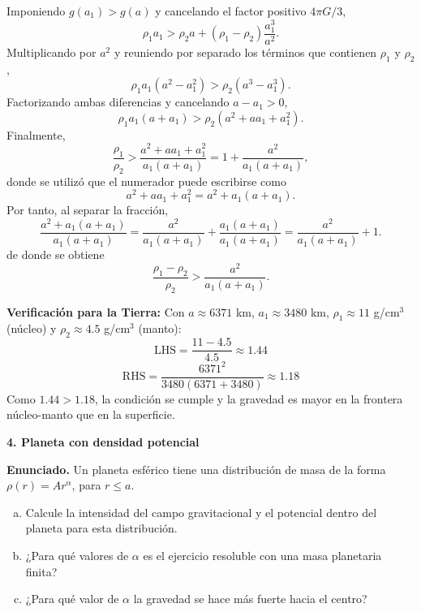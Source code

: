 \begin{enumerate}[a)]
    Imponiendo $g(a_1)>g(a)$ y cancelando el factor positivo $4\pi G/3$,
    $$
    \rho_1a_1>
    \rho_2a+(\rho_1-\rho_2)\frac{a_1^3}{a^2}.
    $$
    Multiplicando por $a^2$ y reuniendo por separado los términos que contienen
    $\rho_1$ y $\rho_2$,
    $$
    \rho_1a_1(a^2-a_1^2)>
    \rho_2(a^3-a_1^3).
    $$
    Factorizando ambas diferencias y cancelando $a-a_1>0$,
    $$
    \rho_1a_1(a+a_1)>
    \rho_2(a^2+aa_1+a_1^2).
    $$
    Finalmente,
    $$
    \frac{\rho_1}{\rho_2}>
    \frac{a^2+aa_1+a_1^2}{a_1(a+a_1)}
    =1+\frac{a^2}{a_1(a+a_1)},
    $$
    donde se utilizó que el numerador puede escribirse como
    $$
    a^2+aa_1+a_1^2
    =a^2+a_1(a+a_1).
    $$
    Por tanto, al separar la fracción,
    $$
    \frac{a^2+a_1(a+a_1)}{a_1(a+a_1)}
    =\frac{a^2}{a_1(a+a_1)}
    +\frac{a_1(a+a_1)}{a_1(a+a_1)}
    =\frac{a^2}{a_1(a+a_1)}+1.
    $$
    de donde se obtiene
    $$
    \boxed{
    \frac{\rho_1-\rho_2}{\rho_2}>
    \frac{a^2}{a_1(a+a_1)}
    }.
    $$
    
    \textbf{Verificación para la Tierra:} Con $a \approx 6371$ km, $a_1 \approx 3480$ km, $\rho_1 \approx 11$ g/cm$^3$ (núcleo) y $\rho_2 \approx 4.5$ g/cm$^3$ (manto):
    $$ \text{LHS} = \frac{11 - 4.5}{4.5} \approx 1.44 $$
    $$ \text{RHS} = \frac{6371^2}{3480(6371+3480)} \approx 1.18 $$
    Como $1.44 > 1.18$, la condición se cumple y la gravedad es mayor en la frontera núcleo-manto que en la superficie.
\end{enumerate}

\medskip
{\large\bfseries 4. Planeta con densidad potencial\par}
\smallskip

\textbf{Enunciado.} Un planeta esférico tiene una distribución de masa de la forma $\rho(r) = Ar^\alpha$, para $r \le a$.
\begin{enumerate}[a)]
    \item Calcule la intensidad del campo gravitacional y el potencial dentro del planeta para esta distribución.
    \item ¿Para qué valores de $\alpha$ es el ejercicio resoluble con una masa planetaria finita?
    \item ¿Para qué valor de $\alpha$ la gravedad se hace más fuerte hacia el centro?
\end{enumerate}

